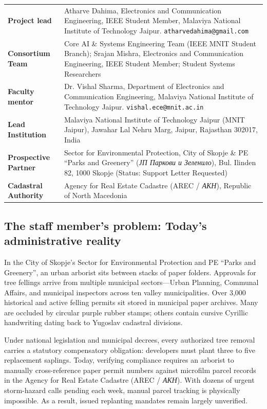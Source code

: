 \documentclass[9pt,a4paper]{article}
\begin{document}
\vspace{-0.2em}
\begin{center}
\renewcommand{\arraystretch}{0.94}
\begin{tabularx}{\textwidth}{@{}p{3.0cm}X@{}}
\textbf{Project lead} & Atharve Dahima, Electronics and Communication Engineering, IEEE Student Member, Malaviya National Institute of Technology Jaipur. \texttt{atharvedahima@gmail.com} \\
\textbf{Consortium Team} & Core AI \& Systems Engineering Team (IEEE MNIT Student Branch); Srajan Mishra, Electronics and Communication Engineering, IEEE Student Member; Student Systems Researchers \\
\textbf{Faculty mentor} & Dr. Vishal Sharma, Department of Electronics and Communication Engineering, Malaviya National Institute of Technology Jaipur. \texttt{vishal.ece@mnit.ac.in} \\
\textbf{Lead Institution} & Malaviya National Institute of Technology Jaipur (MNIT Jaipur), Jawahar Lal Nehru Marg, Jaipur, Rajasthan 302017, India \\
\textbf{Prospective Partner} & Sector for Environmental Protection, City of Skopje \& PE ``Parks and Greenery'' (\textit{ЈП Паркови и Зеленило}), Bul. Ilinden 82, 1000 Skopje (Status: Support Letter Requested) \\
\textbf{Cadastral Authority} & Agency for Real Estate Cadastre (AREC / \textit{АКН}), Republic of North Macedonia \\
\end{tabularx}
\end{center}

\vspace{-0.1em}
\subsection*{The staff member's problem: Today's administrative reality}
In the City of Skopje's Sector for Environmental Protection and PE ``Parks and Greenery'', an urban arborist sits between stacks of paper folders. Approvals for tree fellings arrive from multiple municipal sectors---Urban Planning, Communal Affairs, and municipal inspectors across ten valley municipalities. Over 3,000 historical and active felling permits sit stored in municipal paper archives. Many are occluded by circular purple rubber stamps; others contain cursive Cyrillic handwriting dating back to Yugoslav cadastral divisions.

Under national legislation and municipal decrees, every authorized tree removal carries a statutory compensatory obligation: developers must plant three to five replacement saplings. Today, verifying compliance requires an arborist to manually cross-reference paper permit numbers against microfilm parcel records in the Agency for Real Estate Cadastre (AREC / \textit{АКН}). With dozens of urgent storm-hazard calls pending each week, manual parcel tracking is physically impossible. As a result, issued replanting mandates remain largely unverified.
\end{document}
